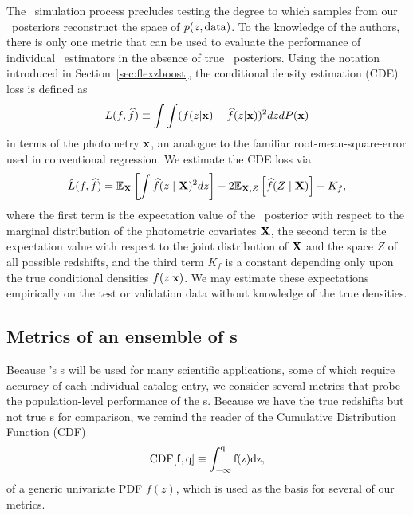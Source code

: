 The \buzz\ simulation process precludes testing the degree to which samples from our \pz\ posteriors reconstruct the space of $p(z, {\rm data})$.
To the knowledge of the authors, there is only one metric that can be used to evaluate the performance of individual \pzpdf\ estimators in the absence of true \pz\ posteriors.
Using the notation introduced in Section~\ref{sec:flexzboost}, the conditional density estimation (CDE) loss is defined as
\begin{equation}
  \label{eq:cde-loss}
  L(f, \widehat{f}) \equiv \int \int (f(z \vert {\mathbf{x}}) - \widehat{f}(z \vert {\mathbf{x}}))^{2} dz dP({\mathbf{x}})
\end{equation}
in terms of the photometry ${\mathbf{x}}$, an analogue to the familiar root-mean-square-error used in conventional regression.
We estimate the CDE loss via
\begin{equation}
  \label{eq:estimated-cde-loss}
  \hat{L}(f, \widehat{f}) = \mathbb{E}_{\mathbf{X}} \left[\int \widehat{f}(z \mid {\mathbf{X}})^{2} dz\right] - 2 \mathbb{E}_{{\mathbf{X}}, Z}\left[\widehat{f}(Z \mid {\mathbf{X}})\right] + K_{f},
\end{equation}
where the first term is the expectation value of the \pz\ posterior with respect to the marginal distribution of the photometric covariates ${\mathbf{X}}$, the second term is the expectation value with respect to the joint distribution of ${\mathbf{X}}$ and the space $Z$ of all possible redshifts, and the third term $K_{f}$ is a constant depending only upon the true conditional densities $f(z \vert {\mathbf{x}})$.
We may estimate these expectations empirically on the test or validation data \citep[Eq.~7 in][]{Izbicki:17b} without knowledge of the true densities.

\subsection{Metrics of an ensemble of \pzpdf s}
\label{sec:qualmet}

Because \lsst's \pzpdf s will be used for many scientific applications, some of which require accuracy of each individual catalog entry, we consider several metrics that probe the population-level performance of the \pzpdf s.
Because we have the true redshifts but not true \pzpdf s for comparison, we remind the reader of the Cumulative Distribution Function (CDF)
\begin{equation}
  \label{eq:cdf}
  \rm{CDF}[f, q] \equiv \int_{-\infty}^{q} f(z) dz,
\end{equation}
of a generic univariate PDF $f(z)$, which is used as the basis for several of our metrics.

